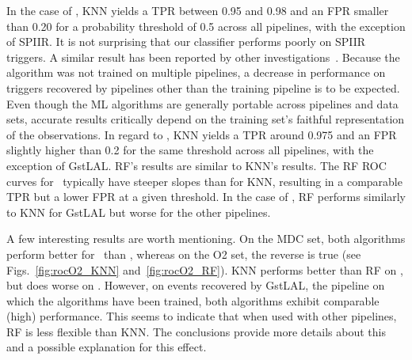 In the case of \hasns, \ac{KNN} yields a \ac{TPR} between 0.95 and 0.98 and an \ac{FPR} smaller than 0.20 for a probability threshold of 0.5 across all pipelines, with the exception of
SPIIR. It is not surprising that our classifier performs poorly on SPIIR triggers. A similar result has been reported by other investigations~\cite{Chaudhary:2023vec}. Because the
algorithm was not trained on multiple pipelines, a decrease in performance on triggers recovered by pipelines other than the training pipeline is to be expected. Even though the \ac{ML}
algorithms are generally portable across pipelines and data sets, accurate results critically depend on the training set's faithful representation of the observations. In regard to
\hasrem, \ac{KNN} yields a \ac{TPR} around 0.975 and an \ac{FPR} slightly higher than 0.2 for the same threshold across all pipelines, with the exception of GstLAL. \ac{RF}'s results are
similar to \ac{KNN}'s results. The \ac{RF} \ac{ROC} curves for \hasns\ typically have steeper slopes than for \ac{KNN}, resulting in a comparable \ac{TPR} but a lower \ac{FPR} at a given
threshold. In the case of \hasrem, \ac{RF} performs similarly to \ac{KNN} for GstLAL but worse for the other pipelines.

A few interesting results are worth mentioning.  On the \ac{MDC} set, both algorithms perform better for \hasns\ than \hasrem, whereas on the \ac{O2} set, the reverse is true (see
Figs.~\ref{fig:rocO2_KNN} and~\ref{fig:rocO2_RF}). \ac{KNN} performs better than \ac{RF} on \hasrem, but does worse on \hasns. However, on events recovered by GstLAL, the pipeline on
which the algorithms have been trained, both algorithms exhibit comparable (high) performance. This seems to indicate that when used with other pipelines, \ac{RF} is less flexible than
\ac{KNN}. The conclusions provide more details about this and a possible explanation for this effect.

